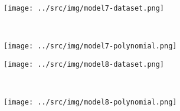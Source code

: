 \documentclass[12pt]{article}
\begin{document}
		\begin{figure}
		\begin{minipage}[c]{.5\textwidth}
			\centering
			\texttt{[image: ../src/img/model7-dataset.png]}
			\label{fig:model7-dataset}
		\end{minipage}
		~
		\begin{minipage}[c]{.5\textwidth}
			\centering
			\texttt{[image: ../src/img/model7-polynomial.png]}
			\label{fig:model7-polynomial}
		\end{minipage}
	\end{figure}

	\begin{figure}
		\begin{minipage}[c]{.5\textwidth}
			\centering
			\texttt{[image: ../src/img/model8-dataset.png]}
			\label{fig:model8-dataset}
		\end{minipage}
		~
		\begin{minipage}[c]{.5\textwidth}
			\centering
			\texttt{[image: ../src/img/model8-polynomial.png]}
			\label{fig:model8-polynomial}
		\end{minipage}
	\end{figure}

	
\end{document}
